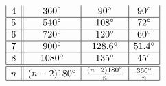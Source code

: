 \documentclass[nooutcomes,noauthor]{ximera}
\begin{document}
\begin{question}
\begin{freeResponse}
\[\begin{array}{|c||c|c|c|}
        4 & 360^\circ & 90^\circ & 90^\circ \\\hline
        5 & 540^\circ & 108^\circ & 72^\circ \\\hline
        6 & 720^\circ & 120^\circ & 60^\circ\\\hline
        7 & 900^\circ & 128.6^\circ& 51.4^\circ\\\hline
        8 & 1080^\circ& 135^\circ& 45^\circ \\\hline\hline
        n & (n-2)180^\circ  & \frac{(n-2)180^\circ}{n} & \frac{360^\circ}{n}\\\hline
  \end{array}
  \]
  \end{freeResponse}
\end{question}
\end{document}
